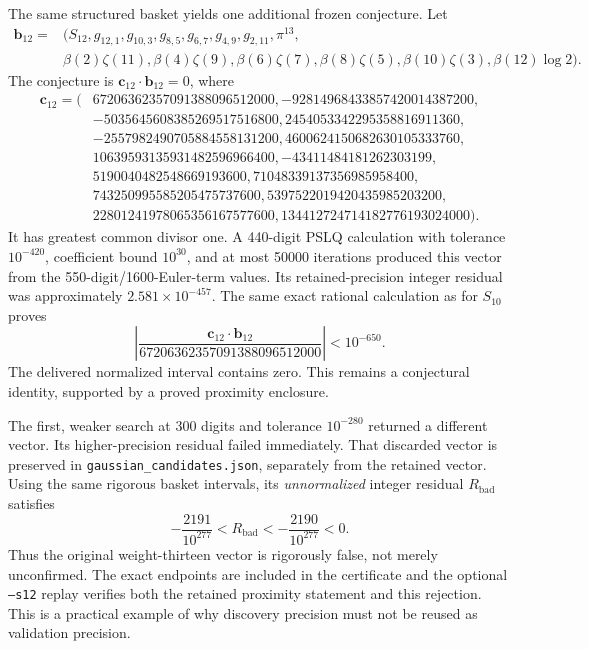 The same structured basket yields one additional frozen conjecture.
Let
\[
\begin{split}
 \mathbf b_{12}={}&(S_{12},g_{12,1},g_{10,3},g_{8,5},g_{6,7},g_{4,9},
 g_{2,11},\pi^{13},\\
 &\beta(2)\zeta(11),\beta(4)\zeta(9),\beta(6)\zeta(7),
 \beta(8)\zeta(5),\beta(10)\zeta(3),\beta(12)\log2).
\end{split}
\]
The conjecture is $\mathbf c_{12}\cdot\mathbf b_{12}=0$, where
\[
\begin{split}
\mathbf c_{12}=(&67206362357091388096512000,
-92814968433857420014387200,\\
&-5035645608385269517516800,
2454053342295358816911360,\\
&-2557982490705884558131200,
4600624150682630105333760,\\
&10639593135931482596966400,-43411484181262303199,\\
&5190040482548669193600,71048339137356985958400,\\
&743250995585205475737600,5397522019420435985203200,\\
&22801241978065356167577600,134412724714182776193024000).
\end{split}
\]
It has greatest common divisor one.  A 440-digit PSLQ calculation with
tolerance $10^{-420}$, coefficient bound $10^{30}$, and at most 50000
iterations produced this vector from the 550-digit/1600-Euler-term
values.  Its retained-precision integer residual was approximately
$2.581\times10^{-457}$.
The same exact rational calculation as for $S_{10}$ proves
\[
 \left|\frac{\mathbf c_{12}\cdot\mathbf b_{12}}
 {67206362357091388096512000}\right|<10^{-650}.
\]
The delivered normalized interval contains zero.  This remains a
conjectural identity, supported by a proved proximity enclosure.

The first, weaker search at 300 digits and tolerance $10^{-280}$
returned a different vector.  Its higher-precision residual failed
immediately.  That discarded vector is preserved in
\texttt{gaussian\_candidates.json}, separately from the retained vector.
Using the same rigorous basket intervals, its \emph{unnormalized}
integer residual $R_{\mathrm{bad}}$ satisfies
\[
 -\frac{2191}{10^{277}}<R_{\mathrm{bad}}
 <-\frac{2190}{10^{277}}<0.
\]
Thus the original weight-thirteen vector is rigorously false, not merely
unconfirmed.  The exact endpoints are included in the certificate and
the optional \texttt{--s12} replay verifies both the retained proximity
statement and this rejection.  This is a practical example of why
discovery precision must not be reused as validation precision.

